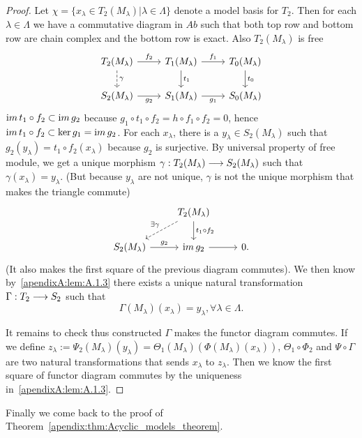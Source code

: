 \documentclass[11pt]{book} %
\begin{document}
\begin{proof}
Let $\chi=\{x_\lambda\in T_2(M_\lambda)|\lambda\in \Lambda\}$ denote a model basis for $T_2$. Then for each $\lambda\in \Lambda$ we have a commutative diagram in $Ab$ such that both top row and bottom row are chain complex and the bottom row is exact. Also $T_2(M_\lambda)$ is free 
\[
\begin{tikzcd}
T_2(M_\lambda)\ar[d, dashed, "\gamma"] \arrow[r, "f_2"] & T_1(M_\lambda) \arrow[r, "f_1"] \arrow[d, "t_1"] & T_0(M_\lambda) \arrow[d, "t_0"] \\
S_2(M_\lambda) \arrow[r, "g_2"'] & S_1(M_\lambda) \arrow[r, "g_1"'] & S_0(M_\lambda)
\end{tikzcd}
\]
${\text im\thinspace} t_1\circ f_2\subset {\text im\thinspace} g_2$ because $g_1\circ t_1\circ f_2=h\circ f_1\circ f_2=0$, hence ${\text im\thinspace} t_1\circ f_2\subset \ker g_1={\text im\thinspace} g_2$. For each $x_\lambda$, there is a $y_\lambda\in S_2(M_\lambda)$ such that $g_2(y_\lambda)=t_1\circ f_2(x_\lambda)$ because $g_2$ is surjective. By universal property of free module, we get a unique morphism $\gamma:T_2(M_\lambda)\longrightarrow S_2(M_\lambda)$ such that $\gamma(x_\lambda)=y_\lambda$. (But because $y_\lambda$ are not unique, $\gamma$ is not the unique morphism that makes the triangle commute)
\[
\begin{tikzcd}
 & T_2(M_\lambda) \arrow[d, "t_1\circ f_2"] \arrow[ld, "\exists \gamma"', dashed] &  \\
S_2(M_\lambda) \arrow[r, "g_2"] & \im g_2 \arrow[r] & 0.
\end{tikzcd}
\]
(It also makes the first square of the previous diagram commutes).
We then know by~\ref{apendixA:lem:A.1.3} there exists a unique natural transformation $\Gamma: T_2\longrightarrow S_2$ such that
$$
\Gamma(M_\lambda)(x_\lambda)=y_\lambda, \forall \lambda\in \Lambda.
$$ 

It remains to check thus constructed $\Gamma$ makes the functor diagram commutes. If we define $z_\lambda:=\Psi_2(M_\lambda)(y_\lambda)=\Theta_1(M_\lambda)(\Phi(M_\lambda)(x_\lambda))$, $\Theta_1\circ\Phi_2$ and $\Psi\circ \Gamma$ are two natural transformations that sends $x_\lambda$ to $z_\lambda$. Then we know the first square of functor diagram commutes by the uniqueness in~\ref{apendixA:lem:A.1.3}.
\end{proof}
Finally we come back to the proof of Theorem~\ref{apendix:thm:Acyclic_models_theorem}.
\end{document}
